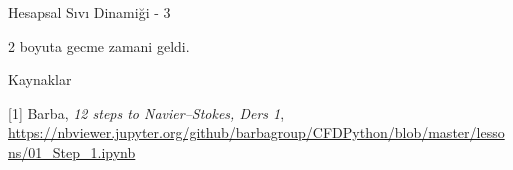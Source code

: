 \documentclass[12pt,fleqn]{article}\usepackage{../../common}
\begin{document}
Hesapsal Sıvı Dinamiği - 3

2 boyuta gecme zamani geldi. 













Kaynaklar

[1] Barba, {\em 12 steps to Navier–Stokes, Ders 1},
    \url{https://nbviewer.jupyter.org/github/barbagroup/CFDPython/blob/master/lessons/01_Step_1.ipynb}
\end{document}
